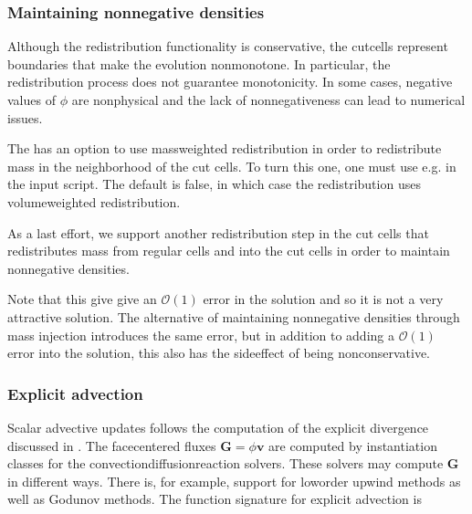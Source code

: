 \documentclass[letterpaper,10pt,english]{sphinxmanual}
\begin{document}
\subsubsection{Maintaining non\sphinxhyphen{}negative densities}
\label{\detokenize{CDR:maintaining-non-negative-densities}}\label{\detokenize{CDR:chap-nonnegative}}
Although the redistribution functionality is conservative, the cut\sphinxhyphen{}cells represent boundaries that make the evolution non\sphinxhyphen{}monotone.
In particular, the redistribution process does not guarantee monotonicity.
In some cases, negative values of \(\phi\) are non\sphinxhyphen{}physical and the lack of non\sphinxhyphen{}negativeness can lead to numerical issues.

The  has an option to use mass\sphinxhyphen{}weighted redistribution in order to redistribute mass in the neighborhood of the cut cells.
To turn this one, one must use e.g.  in the input script.
The default is false, in which case the redistribution uses volume\sphinxhyphen{}weighted redistribution.

As a last effort, we support another redistribution step in the cut cells that redistributes mass from regular cells and into the cut cells in order to maintain non\sphinxhyphen{}negative densities.

\begin{sphinxVerbatim}[commandchars=\\\{\},formatcom=\scriptsize]
  
\end{sphinxVerbatim}

Note that this  give give an \(\mathcal{O}(1)\) error in the solution and so it is not a very attractive solution.
The alternative of maintaining non\sphinxhyphen{}negative densities through mass injection introduces the same error, but in addition to adding a \(\mathcal{O}(1)\) error into the solution, this also has the side\sphinxhyphen{}effect of being non\sphinxhyphen{}conservative.


\subsubsection{Explicit advection}
\label{\detokenize{CDR:explicit-advection}}\label{\detokenize{CDR:chap-explicitadvection}}
Scalar advective updates follows the computation of the explicit divergence discussed in {\hyperref[\detokenize{CDR:chap-explicitdivergence}]{}}.
The face\sphinxhyphen{}centered fluxes \(\mathbf{G} = \phi\mathbf{v}\) are computed by instantiation classes for the convection\sphinxhyphen{}diffusion\sphinxhyphen{}reaction solvers.
These solvers may compute \(\mathbf{G}\) in different ways.
There is, for example, support for low\sphinxhyphen{}order upwind methods as well as Godunov methods.
The function signature for explicit advection is
\end{document}

